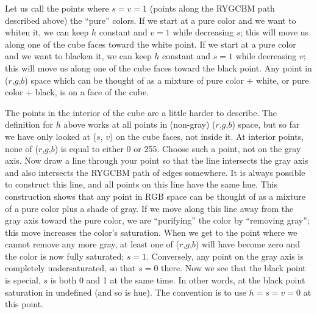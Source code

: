 Let us call the points where $s = v = 1$ (points along the RYGCBM path described above) the ``pure'' colors.  If we start at a pure color
and we want to whiten it, we can keep $h$ constant and $v = 1$
while decreasing $s$; this will move us along one of the cube
faces toward the white point.  If we start at a pure color and we want
to blacken it, we can keep $h$ constant and $s = 1$ while decreasing
$v$; this will move us along one of the cube faces toward the black
point.  Any point in ($r$,$g$,$b$) space which can be thought of as a
mixture of pure color + white, or pure color + black, is on a face of
the cube.

The points in the interior of the cube are a little harder to describe.
The definition for $h$ above works at all points in (non-gray)
($r$,$g$,$b$) space, but so far we have only looked at ($s$,
$v$) on the cube faces, not inside it.  At interior points, none
of ($r$,$g$,$b$) is equal to either 0 or 255.  Choose such a point,
not on the gray axis.  Now draw a line through your point so that the
line intersects the gray axis and also intersects the RYGCBM path of
edges somewhere.  It is always possible to construct this line, and
all points on this line have the same hue.  This construction shows
that any point in RGB space can be thought of as a mixture of a pure
color plus a shade of gray.  If we move along this line away from the
gray axis toward the pure color, we are ``purifying'' the color by
``removing gray''; this move increases the color's saturation.  When
we get to the point where we cannot remove any more gray, at least one
of ($r$,$g$,$b$) will have become zero and the color is now fully
saturated; $s = 1$.  Conversely, any point on the gray axis is
completely undersaturated, so that $s = 0$ there.  Now we see that
the black point is special, $s$ is both 0 and 1 at the same time. In other words, at the black point saturation in undefined (and so is hue). The convention is to use $h = s = v = 0$ at this point.

